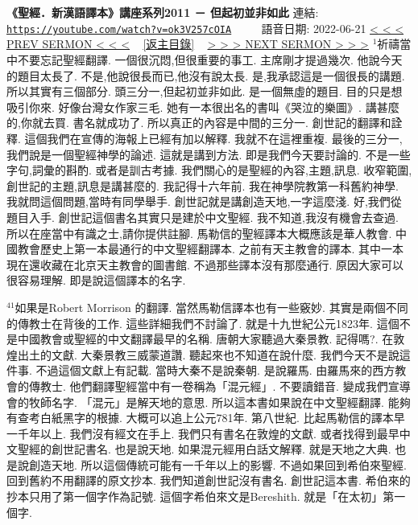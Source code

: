 \documentclass{book}
\begin{document}
\section{}
\label{sec:ok3V257cOIA}
\textbf{《聖經．新漢語譯本》講座系列2011 － 但起初並非如此}
\newline
\newline
連結: \href{https://youtube.com/watch?v=ok3V257cOIA}{\texttt{https://youtube.com/watch?v=ok3V257cOIA}} ~~~~ 語音日期: 2022-06-21
\newline
\newline
\hyperref[sec:FbD104WC_Bk]{\small{< < < PREV SERMON < < <}}
~
\hyperref[sec:index]{\small{[返主目錄]}}
~
\hyperref[sec:9gWlq_OvVJU]{\small{> > > NEXT SERMON > > >}}
\newline
\newline
$^{1}$祈禱當中不要忘記聖經翻譯.
一個很沉悶,但很重要的事工.
主席剛才提過幾次.
他說今天的題目太長了.
不是,他說很長而已,他沒有說太長.
是,我承認這是一個很長的講題.
所以其實有三個部分.
頭三分一,但起初並非如此.
是一個無虛的題目.
目的只是想吸引你來.
好像台灣女作家三毛.
她有一本很出名的書叫《哭泣的樂圖》.
講甚麼的,你就去買.
書名就成功了.
所以真正的內容是中間的三分一.
創世記的翻譯和詮釋.
這個我們在宣傳的海報上已經有加以解釋.
我就不在這裡重複.
最後的三分一,我們說是一個聖經神學的論述.
這就是講到方法.
即是我們今天要討論的.
不是一些字句,詞彙的斟酌.
或者是訓古考據.
我們關心的是聖經的內容,主題,訊息.
收窄範圍,創世記的主題,訊息是講甚麼的.
我記得十六年前.
我在神學院教第一科舊約神學.
我就問這個問題,當時有同學舉手.
創世記就是講創造天地,一字這麼淺.
好,我們從題目入手.
創世記這個書名其實只是建於中文聖經.
我不知道,我沒有機會去查過.
所以在座當中有識之士,請你提供註腳.
馬勒信的聖經譯本大概應該是華人教會.
中國教會歷史上第一本最通行的中文聖經翻譯本.
之前有天主教會的譯本.
其中一本現在還收藏在北京天主教會的圖書館.
不過那些譯本沒有那麼通行.
原因大家可以很容易理解.
即是說這個譯本的名字.

$^{41}$如果是Robert Morrison 的翻譯.
當然馬勒信譯本也有一些竅妙.
其實是兩個不同的傳教士在背後的工作.
這些詳細我們不討論了.
就是十九世紀公元1823年.
這個不是中國教會或聖經的中文翻譯最早的名稱.
唐朝大家聽過大秦景教.
記得嗎?.
在敦煌出土的文獻.
大秦景教三威蒙道讚.
聽起來也不知道在說什麼.
我們今天不是說這件事.
不過這個文獻上有記載.
當時大秦不是說秦朝.
是說羅馬.
由羅馬來的西方教會的傳教士.
他們翻譯聖經當中有一卷稱為「混元經」.
不要讀錯音.
變成我們宣導會的牧師名字.
「混元」是解天地的意思.
所以這本書如果說在中文聖經翻譯.
能夠有查考白紙黑字的根據.
大概可以追上公元781年.
第八世紀.
比起馬勒信的譯本早一千年以上.
我們沒有經文在手上.
我們只有書名在敦煌的文獻.
或者找得到最早中文聖經的創世記書名.
也是說天地.
如果混元經用白話文解釋.
就是天地之大典.
也是說創造天地.
所以這個傳統可能有一千年以上的影響.
不過如果回到希伯來聖經.
回到舊約不用翻譯的原文抄本.
我們知道創世記沒有書名.
創世記這本書.
希伯來的抄本只用了第一個字作為記號.
這個字希伯來文是Bereshith.
就是「在太初」第一個字.
\end{document}
